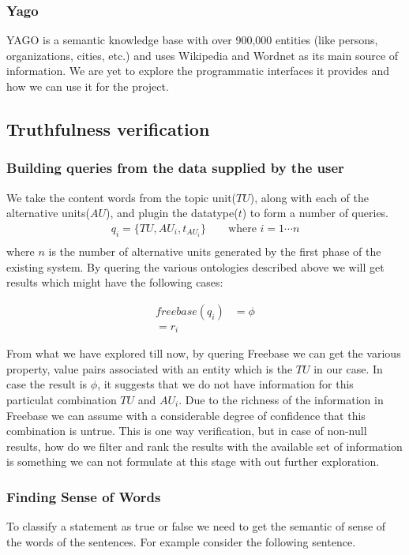 \documentclass[11pt]{article}
\begin{document}
\subsubsection{Yago}
YAGO is a semantic knowledge base with over 900,000 entities (like persons,
organizations, cities, etc.) and uses Wikipedia and Wordnet as its main source of
information. We are yet to explore the programmatic interfaces it provides and
how we can use it for the project.




\subsection{Truthfulness verification }
\subsubsection {Building queries from the data supplied by the user}

We take the content words from the topic unit($TU$), along with each of the
alternative units($AU$), and plugin the datatype($t$) to form a number of
queries.
\begin{align*}
q_{i} = \{{TU, AU_{i}, t_{AU_{i}}} \} \qquad \mbox {where $i = 1 \cdots n$} \\
\end{align*}
where $n$ is the number of alternative units generated by the first phase of
the existing system. By quering the various ontologies described above we will
get results which might have the following cases:

\begin{align*}
   freebase(q_{i}) &= \phi \\
    = r_{i}
\end{align*}

From what we have explored till now, by quering Freebase we can get the
various property, value pairs associated with an entity which is the $TU$ in
our case. In case the result is $\phi$, it suggests that we do not have
information for this particulat combination $TU$ and $AU_{i}$. Due to the richness of the information in Freebase we can assume with a considerable degree of confidence
that this combination is untrue. This is one way verification, but in case of
non-null results, how do we filter and rank the results with the available set
of information is something we can not formulate at this stage with out further
exploration.

\subsubsection{Finding Sense of Words}
To classify a statement as true or false we need to get the semantic of sense of the words of the sentences. For example consider the following sentence. 
\end{document}
